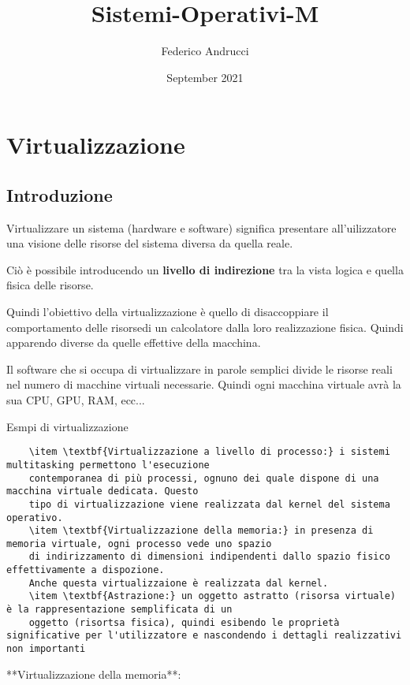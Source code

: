 \documentclass[a4paper, 11pt, twoside, openright]{book}
\title{Sistemi-Operativi-M}
\author{Federico Andrucci}
\date{September 2021}
\begin{document}
\maketitle
\tableofcontents

\chapter{Virtualizzazione}
\section{Introduzione}

Virtualizzare un sistema (hardware e software) significa presentare all'uilizzatore una visione delle risorse del sistema diversa da quella reale.

Ciò è possibile introducendo un \textbf{livello di indirezione} tra la vista logica e quella fisica delle risorse.

Quindi l'obiettivo della virtualizzazione è quello di disaccoppiare il comportamento delle risorsedi un calcolatore dalla loro realizzazione fisica. 
Quindi apparendo diverse da quelle effettive della macchina.

Il software che si occupa di virtualizzare in parole semplici divide le risorse reali nel numero di macchine virtuali necessarie. 
Quindi ogni macchina virtuale avrà la sua CPU, GPU, RAM, ecc...

Esmpi di virtualizzazione
\begin{lstlisting}
    \item \textbf{Virtualizzazione a livello di processo:} i sistemi multitasking permettono l'esecuzione 
    contemporanea di più processi, ognuno dei quale dispone di una macchina virtuale dedicata. Questo
    tipo di virtualizzazione viene realizzata dal kernel del sistema operativo.
    \item \textbf{Virtualizzazione della memoria:} in presenza di memoria virtuale, ogni processo vede uno spazio
    di indirizzamento di dimensioni indipendenti dallo spazio fisico effettivamente a dispozione.
    Anche questa virtualizzaione è realizzata dal kernel.
    \item \textbf{Astrazione:} un oggetto astratto (risorsa virtuale) è la rappresentazione semplificata di un 
    oggetto (risortsa fisica), quindi esibendo le proprietà significative per l'utilizzatore e nascondendo i dettagli realizzativi non importanti
\end{lstlisting}

**Virtualizzazione della memoria**: 
\end{document}
